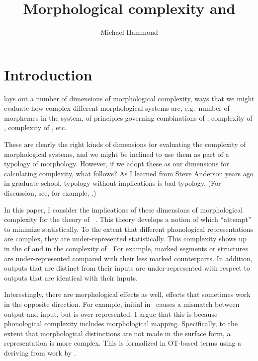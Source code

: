 \documentclass[output=paper,
modfonts
]{LSP/langsci}
\title{Morphological complexity and \io}
\author{Michael Hammond\affiliation{University of Arizona}}
\begin{document}
\maketitle 
\section{Introduction}

\citet{dimensions} lays out a number of dimensions of morphological complexity, ways that we might evaluate how complex different morphological systems are, e.g.\ number of morphemes in the system,  of principles governing combinations of , complexity of , complexity of , etc.

These are clearly the right kinds of dimensions for evaluating the complexity of morphological systems, and we might be inclined to use them as part of a typology of morphology. However, if we adopt these as our dimensions for calculating complexity, what follows? As I learned from Steve Anderson years ago in graduate school, typology without implications is bad typology. (For discussion, see, for example, \citealt{sra.formalist}.)

In this paper, I consider the implications of these dimensions of morphological complexity for the theory of \io\ \citep{inopt,hammond.complexity,inopt.phon}. This theory develops a notion of  which  ``attempt'' to minimize statistically. To the extent that different phonological representations are complex, they are under-represented statistically. This complexity shows up in the  of  and in the complexity of . For example, marked segments or  structures are under-represented compared with their less marked counterparts. In addition, outputs that are distinct from their inputs are under-represented with respect to outputs that are identical with their inputs.

Interestingly, there are morphological effects as well, effects that sometimes work in the opposite direction. For example, initial  in \w\ causes a mismatch between output and input, but is over-represented. I argue that this is because phonological complexity includes morphological mapping. Specifically, to the extent that morphological distinctions are not made in the surface form, a representation is more complex. This is formalized in OT-based terms using a  deriving from work by \citet{kurisu}.
\end{document}
